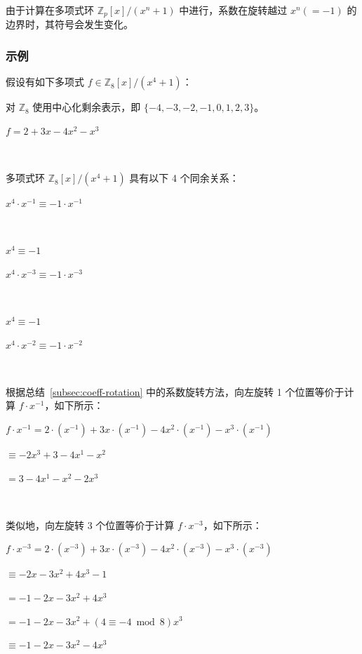 由于计算在多项式环 $\mathbb{Z}_p[x] / (x^n + 1)$ 中进行，系数在旋转越过 $x^n (= -1)$ 的边界时，其符号会发生变化。




\subsubsection{示例}
\label{subsec:coeff-rotation-ex}

假设有如下多项式 $f \in \mathbb{Z}_8[x] / (x^4 + 1)$：

对 $\mathbb{Z}_8$ 使用中心化剩余表示，即 $\{-4,-3,-2,-1,0,1,2,3\}$。

$f = 2 + 3x - 4x^2 -x^3$




$ $

多项式环 $\mathbb{Z}_8[x] / (x^4 + 1)$ 具有以下 4 个同余关系：

{}

$x^4 \cdot x^{-1} \equiv -1 \cdot x^{-1}$

{}

$ $

$x^4 \equiv -1$

$x^4 \cdot x^{-3} \equiv -1 \cdot x^{-3}$

{}

$ $

$x^4 \equiv -1$

$x^4 \cdot x^{-2} \equiv -1 \cdot x^{-2}$

{}

$ $



根据总结~\ref*{subsec:coeff-rotation} 中的系数旋转方法，向左旋转 1 个位置等价于计算 $f \cdot x^{-1}$，如下所示：

$f\cdot x^{-1} = 2\cdot(x^{-1}) + 3x\cdot(x^{-1}) - 4x^2\cdot(x^{-1}) - x^3\cdot(x^{-1})$

$\equiv -2x^{3} + 3 - 4x^1 - x^2$

$= 3 - 4x^1 - x^2 -2x^{3}$

$ $

类似地，向左旋转 3 个位置等价于计算 $f \cdot x^{-3}$，如下所示：

$f\cdot x^{-3} = 2\cdot(x^{-3}) + 3x\cdot(x^{-3}) - 4x^2\cdot(x^{-3}) - x^3\cdot(x^{-3})$

$\equiv -2x - 3x^2 + 4x^3 - 1$

$= -1 - 2x - 3x^2 + 4x^3$

$= -1 - 2x - 3x^2 + (4 \equiv -4 \bmod 8) x^3$

$\equiv -1 - 2x - 3x^2 -4x^3$